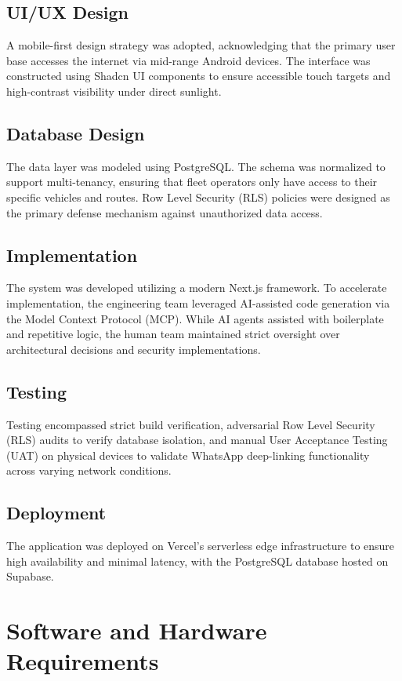\documentclass[12pt, a4paper, oneside]{report}
\begin{document}
\section{UI/UX Design}
A mobile-first design strategy was adopted, acknowledging that the primary user base accesses the internet via mid-range Android devices. The interface was constructed using Shadcn UI components to ensure accessible touch targets and high-contrast visibility under direct sunlight.

\section{Database Design}
The data layer was modeled using PostgreSQL. The schema was normalized to support multi-tenancy, ensuring that fleet operators only have access to their specific vehicles and routes. Row Level Security (RLS) policies were designed as the primary defense mechanism against unauthorized data access.

\section{Implementation}
The system was developed utilizing a modern Next.js framework. To accelerate implementation, the engineering team leveraged AI-assisted code generation via the Model Context Protocol (MCP). While AI agents assisted with boilerplate and repetitive logic, the human team maintained strict oversight over architectural decisions and security implementations.

\section{Testing}
Testing encompassed strict build verification, adversarial Row Level Security (RLS) audits to verify database isolation, and manual User Acceptance Testing (UAT) on physical devices to validate WhatsApp deep-linking functionality across varying network conditions.

\section{Deployment}
The application was deployed on Vercel's serverless edge infrastructure to ensure high availability and minimal latency, with the PostgreSQL database hosted on Supabase.

\chapter{Software and Hardware Requirements}
\end{document}
